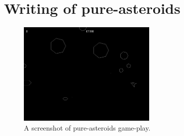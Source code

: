 \documentclass[
  digital, %
  color,   %
  table,   %
  oneside, %
  lof,     %
  lot,     %
]{fithesis3}
\begin{document}
\section{Writing of pure-asteroids}
\label{sect:pureimplementation}

\begin{figure}[hbt!]
    \centering
    \includegraphics[height=5cm]{images/pure-screenshot.png}
    \caption{A screenshot of pure-asteroids game-play.}
    \label{fig:pureasteroidsscreenshot}
\end{figure}
\end{document}
